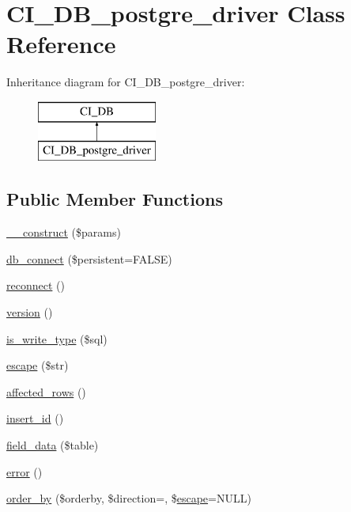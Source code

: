 \hypertarget{class_c_i___d_b__postgre__driver}{}\section{C\+I\+\_\+\+D\+B\+\_\+postgre\+\_\+driver Class Reference}
\label{class_c_i___d_b__postgre__driver}
Inheritance diagram for C\+I\+\_\+\+D\+B\+\_\+postgre\+\_\+driver\+:\begin{figure}[H]
\begin{center}
\leavevmode
\includegraphics[height=2.000000cm]{class_c_i___d_b__postgre__driver}
\end{center}
\end{figure}
\subsection*{Public Member Functions}
\begin{DoxyCompactItemize}
\item 
\mbox{\hyperlink{class_c_i___d_b__postgre__driver_a9162320adff1a1a4afd7f2372f753a3e}{\+\_\+\+\_\+construct}} (\$params)
\item 
\mbox{\hyperlink{class_c_i___d_b__postgre__driver_a52bf595e79e96cc0a7c907a9b45aeb4d}{db\+\_\+connect}} (\$persistent=F\+A\+L\+SE)
\item 
\mbox{\hyperlink{class_c_i___d_b__postgre__driver_a57c19c642ab3023e28d10c50f86ff0a8}{reconnect}} ()
\item 
\mbox{\hyperlink{class_c_i___d_b__postgre__driver_a6080dae0886626b9a4cedb29240708b1}{version}} ()
\item 
\mbox{\hyperlink{class_c_i___d_b__postgre__driver_af435df5703c238769d6d16fde6d51182}{is\+\_\+write\+\_\+type}} (\$sql)
\item 
\mbox{\hyperlink{class_c_i___d_b__postgre__driver_ac8f37ca5703d4558c732e692194f8cd6}{escape}} (\$str)
\item 
\mbox{\hyperlink{class_c_i___d_b__postgre__driver_a77248aaad33eb132c04cc4aa3f4bc8cb}{affected\+\_\+rows}} ()
\item 
\mbox{\hyperlink{class_c_i___d_b__postgre__driver_a933f2cde8dc7f87875e257d0a4902e99}{insert\+\_\+id}} ()
\item 
\mbox{\hyperlink{class_c_i___d_b__postgre__driver_a90355121e1ed009e0efdbd544ab56efa}{field\+\_\+data}} (\$table)
\item 
\mbox{\hyperlink{class_c_i___d_b__postgre__driver_a43b8d30b879d4f09ceb059b02af2bc02}{error}} ()
\item 
\mbox{\hyperlink{class_c_i___d_b__postgre__driver_a6d1ce6a3b22187165ce7d710ce91841d}{order\+\_\+by}} (\$orderby, \$direction=\textquotesingle{}\textquotesingle{}, \$\mbox{\hyperlink{class_c_i___d_b__postgre__driver_ac8f37ca5703d4558c732e692194f8cd6}{escape}}=N\+U\+LL)
\end{DoxyCompactItemize}
